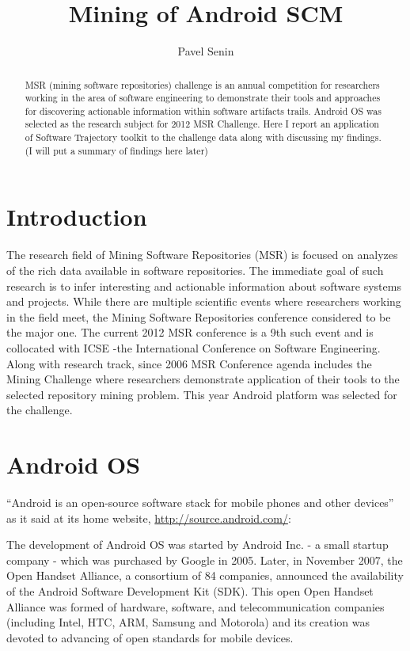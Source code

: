 \documentclass[a4paper,10pt]{article}
\numberwithin{equation}{subsection}
\begin{document}
\title{Mining of Android SCM}
\author{Pavel Senin}

\maketitle

\begin{abstract}
MSR (mining software repositories) challenge is an annual competition for researchers working in the area of
software engineering to demonstrate their tools and approaches for discovering actionable information within
software artifacts trails. Android OS was selected as the research subject for 2012 MSR Challenge. 
Here I report an application of Software Trajectory toolkit to the challenge data along with discussing my findings.
(I will put a summary of findings here later)
\end{abstract}

\section{Introduction}
The research field of Mining Software Repositories (MSR) is focused on analyzes of the rich 
data available in software repositories. The immediate goal of such research is to infer interesting 
and actionable information about software systems and projects. While there are multiple scientific 
events where researchers working in the field meet, the Mining Software Repositories 
conference considered to be the major one. The current 2012 MSR conference is a 9th such event
and is collocated with ICSE -the International Conference on Software Engineering.
Along with research track, since 2006 MSR Conference agenda includes the Mining Challenge where 
researchers demonstrate application of their tools to the selected repository mining problem. This
year Android platform was selected for the challenge.

\section{Android OS}
``Android is an open-source software stack for mobile phones and other devices'' as it said 
at its home website, \url{http://source.android.com/}: 

The development of Android OS was started by Android Inc. - a small startup company - which was purchased by Google 
in 2005. Later, in November 2007, the Open Handset Alliance, a consortium of 84 companies, announced 
the availability of the Android Software Development Kit (SDK). This open Open Handset Alliance was formed 
of hardware, software, and telecommunication companies (including Intel, HTC, ARM, Samsung and Motorola)
and its creation was devoted to advancing of open standards for mobile devices. 
\end{document}
